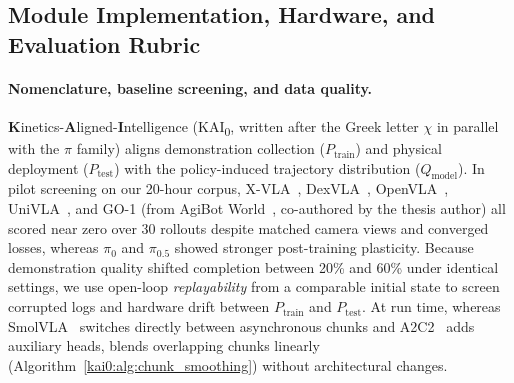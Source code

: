 \subsection{Module Implementation, Hardware, and Evaluation Rubric}\label{kai0:app:name}\label{kai0:app:related_rl}\label{kai0:app:related_control}\label{kai0:app:data}\label{kai0:app:hardware}\label{kai0:app:loss}\label{kai0:app:questions}\label{kai0:app:related}\label{kai0:app:method}\label{kai0:app:ma}\label{kai0:app:sa}\label{kai0:app:tda}\label{kai0:app:exp}\label{kai0:app:hyperparams}\label{kai0:app:loss_curve}\label{kai0:app:scoring}

\paragraph{Nomenclature, baseline screening, and data quality.}
\textbf{K}inetics-\textbf{A}ligned-\textbf{I}ntelligence (KAI\textsubscript{0}, written \chiz after the Greek letter $\chi$ in parallel with the $\pi$ family) aligns demonstration collection ($P_{\mathrm{train}}$) and physical deployment ($P_{\mathrm{test}}$) with the policy-induced trajectory distribution ($Q_{\mathrm{model}}$). In pilot screening on our 20-hour corpus, X-VLA~\cite{zheng2025xvla}, DexVLA~\cite{wen2025dexvla}, OpenVLA~\cite{kim2024openvla}, UniVLA~\cite{bu2025univla}, and GO-1 (from AgiBot World~\cite{bu2025agibot_iros}, co-authored by the thesis author) all scored near zero over 30 rollouts despite matched camera views and converged losses, whereas $\pi_0$ and $\pi_{0.5}$ showed stronger post-training plasticity. Because demonstration quality shifted completion between 20\% and 60\% under identical settings, we use open-loop \emph{replayability} from a comparable initial state to screen corrupted logs and hardware drift between $P_{\mathrm{train}}$ and $P_{\mathrm{test}}$. At run time, whereas SmolVLA~\cite{shukor2025smolvla} switches directly between asynchronous chunks and A2C2~\cite{sendai2025leave} adds auxiliary heads, \chiz blends overlapping chunks linearly (Algorithm~\ref{kai0:alg:chunk_smoothing}) without architectural changes.

